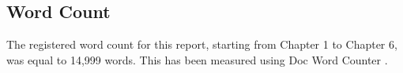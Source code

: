 \begin{appendices}
\clearpage


\section{Word Count}
\label{count}

The registered word count for this report, starting from Chapter 1 to Chapter 6, was equal to 14,999 words. This has been measured using Doc Word Counter \cite{count_w}.

\end{appendices}